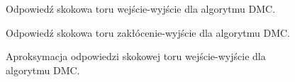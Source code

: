 \documentclass[a4paper,titlepage,11pt,twosides,floatssmall]{mwrep}
\begin{document}
\begin{figure}[H]
	\centering
	
	\caption{Odpowiedź skokowa toru wejście-wyjście dla algorytmu DMC.}
	\label{skok_DMC}
\end{figure}

\begin{figure}[H]
	\centering
	
	\caption{Odpowiedź skokowa toru zakłócenie-wyjście dla algorytmu DMC.}
	\label{skok_DMC_zak}
\end{figure}
	
	
\begin{figure}[H]
	\centering
	
	\caption{Aproksymacja odpowiedzi skokowej toru wejście-wyjście dla algorytmu DMC.}
	\label{skok_DMC_apro}
\end{figure}
\end{document}
